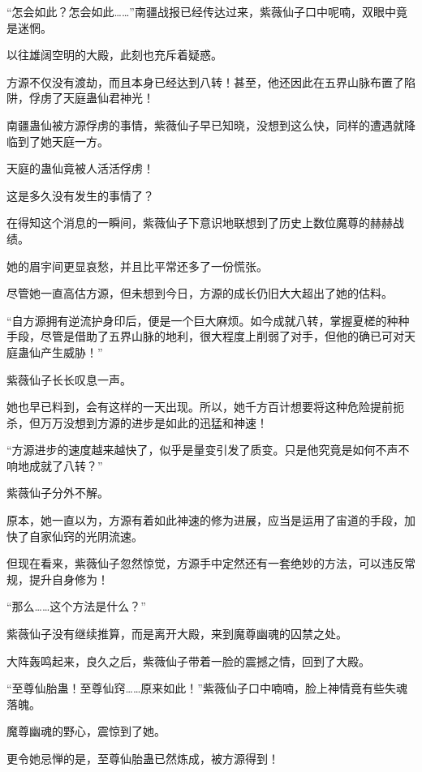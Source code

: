 
\begin{this_body}



“怎会如此？怎会如此……”南疆战报已经传达过来，紫薇仙子口中呢喃，双眼中竟是迷惘。

以往雄阔空明的大殿，此刻也充斥着疑惑。

方源不仅没有渡劫，而且本身已经达到八转！甚至，他还因此在五界山脉布置了陷阱，俘虏了天庭蛊仙君神光！

南疆蛊仙被方源俘虏的事情，紫薇仙子早已知晓，没想到这么快，同样的遭遇就降临到了她天庭一方。

天庭的蛊仙竟被人活活俘虏！

这是多久没有发生的事情了？

在得知这个消息的一瞬间，紫薇仙子下意识地联想到了历史上数位魔尊的赫赫战绩。

她的眉宇间更显哀愁，并且比平常还多了一份慌张。

尽管她一直高估方源，但未想到今日，方源的成长仍旧大大超出了她的估料。

“自方源拥有逆流护身印后，便是一个巨大麻烦。如今成就八转，掌握夏槎的种种手段，尽管是借助了五界山脉的地利，很大程度上削弱了对手，但他的确已可对天庭蛊仙产生威胁！”

紫薇仙子长长叹息一声。

她也早已料到，会有这样的一天出现。所以，她千方百计想要将这种危险提前扼杀，但万万没想到方源的进步是如此的迅猛和神速！

“方源进步的速度越来越快了，似乎是量变引发了质变。只是他究竟是如何不声不响地成就了八转？”

紫薇仙子分外不解。

原本，她一直以为，方源有着如此神速的修为进展，应当是运用了宙道的手段，加快了自家仙窍的光阴流速。

但现在看来，紫薇仙子忽然惊觉，方源手中定然还有一套绝妙的方法，可以违反常规，提升自身修为！

“那么……这个方法是什么？”

紫薇仙子没有继续推算，而是离开大殿，来到魔尊幽魂的囚禁之处。

大阵轰鸣起来，良久之后，紫薇仙子带着一脸的震撼之情，回到了大殿。

“至尊仙胎蛊！至尊仙窍……原来如此！”紫薇仙子口中喃喃，脸上神情竟有些失魂落魄。

魔尊幽魂的野心，震惊到了她。

更令她忌惮的是，至尊仙胎蛊已然炼成，被方源得到！


\end{this_body}
